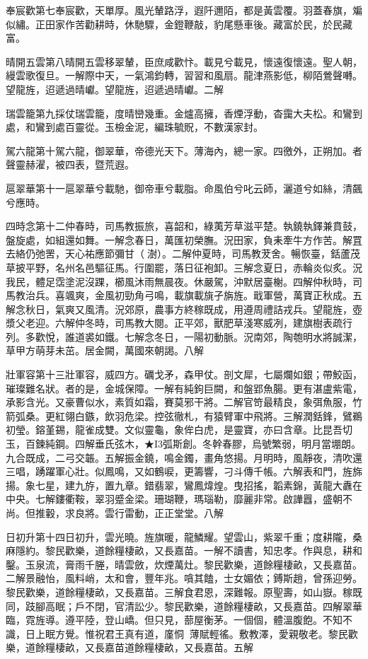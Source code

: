 \begin{pinyinscope}
奉宸歡第七奉宸歡，天單厚。風光輦路浮，遐阡邇陌，都是黃雲覆。羽蓋春旗，斒似繡。正田家作苦勸耕時，休馳驟，金鐙鞭敲，豹尾懸車後。藏富於民，於民藏富。

晴開五雲第八晴開五雲移翠輦，臣庶咸歡忭。載見兮載見，懷遠復懷遠。聖人朝，縵雲歌復旦。一解際中天，一氣鴻鈞轉，習習和風扇。龍津燕影低，柳陌鶯聲囀。望龍旌，迢遞過晴巘。望龍旌，迢遞過晴巘。二解

瑞雲籠第九採仗瑞雲籠，度晴巒幾重。金爐高擁，香煙浮動，杳靄大夫松。和鸞到處，和鸞到處百靈從。玉檢金泥，編珠毓貺，不數漢家封。

駕六龍第十駕六龍，御翠華，帝德光天下。薄海內，總一家。四徼外，正朔加。者聲靈赫濯，被四表，暨荒遐。

扈翠華第十一扈翠華兮載馳，御帝車兮載脂。命風伯兮叱云師，灑道兮如絲，清飆兮應時。

四時念第十二仲春時，司馬教振旅，喜韶和，綠荑芳草滋平楚。執鐃執鐸兼賁鼓，盤旋處，如組還如舞。一解念春日，萬匯初榮膴。況田家，負耒牽牛方作苦。解罝去絡仍弛罟，天心祐應節彌甘（澍）。二解仲夏時，司馬教茇舍。暢恢臺，銛蘆茂草披平野，名州名邑驅征馬。行圍罷，落日征袍卸。三解念夏日，赤輪炎似炙。況我民，體足霑塗泥沒踝，櫛風沐雨無晨夜。休嚴駕，沖默居臺榭。四解仲秋時，司馬教治兵。喜颯爽，金風初勁角弓鳴，載旗載旐孑旃旌。戢軍營，萬寶正秋成。五解念秋日，氣爽又風清。況郊原，農事方終稼既成，用遵周禮詰戎兵。望龍旌，壺漿父老迎。六解仲冬時，司馬教大閱。正平郊，獸肥草淺寒威冽，建旗樹表疏行列。多歡悅，誰道裘如鐵。七解念冬日，一陽初動脈。況南郊，陶匏明水將誠潔，草甲方萌芽未茁。居金闕，萬國來朝謁。八解

壯軍容第十三壯軍容，威四方。礪戈矛，森甲仗。剖文犀，七屬爛如銀；帶鮫函，璀璨難名狀。者的是，金城保障。一解有純鉤巨闕，和盤郢魚腸。更有湛盧紫電，承影含光。又豪曹似水，素質如霜，賽莫邪干將。二解官笴最精良，象弭魚服，竹箭弧桑。更紅翎白鏃，飲羽危梁。控弦徹札，有猿臂軍中飛將。三解潤銛鋒，鷿鵜初瑩。鎔堇錫，龍雀成雙。文似靈龜，象侔白虎，是靈寶，亦曰含章。比昆吾切玉，百鍊純鋼。四解垂氏弦木，★I3弧斯創。冬幹春膠，烏號繁弱，明月當堋朗。九合既成，二弓交韔。五解振金鐃，鳴金鐲，畫角悠揚。月明時，風靜夜，清吹還三唱，踴躍軍心壯。似鳳鳴，又如鶴唳，更籌響，刁斗傳千帳。六解表和門，旌旆揚。象七星，建九斿，置九章。錯翡翠，鸞鳳煒煌。曳招搖，韜素錦，黃龍大纛在中央。七解鏤衢鞍，翠羽蹙金梁。珊瑚鞭，瑪瑙勒，靡麗非常。啟譁囂，盛朝不尚。但推轂，求良將。雲行雷動，正正堂堂。八解

日初升第十四日初升，雲光曉。旌旗暖，龍鱗耀。望雲山，紫翠千重；度耕隴，桑麻隱約。黎民歡樂，道餘糧棲畝，又長嘉苗。一解不讀書，知忠孝。作與息，耕和鑿。玉泉流，膏雨千塍，晴雲斂，炊煙萬灶。黎民歡樂，道餘糧棲畝，又長嘉苗。二解景融怡，風料峭，太和會，豐年兆。嗿其饁，士女媚依；鎛斯趙，曾孫迎勞。黎民歡樂，道餘糧棲畝，又長嘉苗。三解食君恩，深難報。原聖壽，如山嶽。稼既同，跂腳高眠；戶不閉，官清訟少。黎民歡樂，道餘糧棲畝，又長嘉苗。四解翠華臨，霓旌導。遵平陸，登山嶠。但只見，蔀屋衡茅。一個個，體溫腹飽。不知不識，日上眠方覺。惟祝君王真有道，廑恫，薄賦輕徭。敷教澤，愛親敬老。黎民歡樂，道餘糧棲畝，又長嘉苗道餘糧棲畝，又長嘉苗。五解


\end{pinyinscope}
